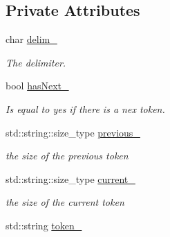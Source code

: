 \subsection*{Private Attributes}
\begin{DoxyCompactItemize}
\item 
\hypertarget{classSplitter_a3b7c9064cca2361c0388395b38bec579}{
char \hyperlink{classSplitter_a3b7c9064cca2361c0388395b38bec579}{delim\_\-}}
\label{classSplitter_a3b7c9064cca2361c0388395b38bec579}

\begin{DoxyCompactList}\small\item\em The delimiter. \item\end{DoxyCompactList}\item 
\hypertarget{classSplitter_a1029aba99a088cfcf5936f9c921b4e76}{
bool \hyperlink{classSplitter_a1029aba99a088cfcf5936f9c921b4e76}{hasNext\_\-}}
\label{classSplitter_a1029aba99a088cfcf5936f9c921b4e76}

\begin{DoxyCompactList}\small\item\em Is equal to yes if there is a nex token. \item\end{DoxyCompactList}\item 
\hypertarget{classSplitter_aeba274b41ab41513486c1dacc87acb9b}{
std::string::size\_\-type \hyperlink{classSplitter_aeba274b41ab41513486c1dacc87acb9b}{previous\_\-}}
\label{classSplitter_aeba274b41ab41513486c1dacc87acb9b}

\begin{DoxyCompactList}\small\item\em the size of the previous token \item\end{DoxyCompactList}\item 
\hypertarget{classSplitter_a582ea00d95874fd70cbcf3af257ac886}{
std::string::size\_\-type \hyperlink{classSplitter_a582ea00d95874fd70cbcf3af257ac886}{current\_\-}}
\label{classSplitter_a582ea00d95874fd70cbcf3af257ac886}

\begin{DoxyCompactList}\small\item\em the size of the current token \item\end{DoxyCompactList}\item 
\hypertarget{classSplitter_a2c4ef94b3d44dff8604cf8611dbef46d}{
std::string \hyperlink{classSplitter_a2c4ef94b3d44dff8604cf8611dbef46d}{token\_\-}}
\label{classSplitter_a2c4ef94b3d44dff8604cf8611dbef46d}


\end{DoxyCompactItemize}
